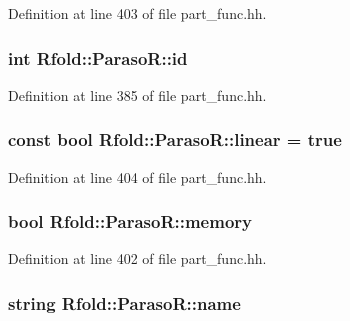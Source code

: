 Definition at line 403 of file part\+\_\+func.\+hh.

\hypertarget{class_rfold_1_1_paraso_r_a707ccdcc12115fbe06a923fb21e58c06}{
\subsubsection[{id}]{\setlength{\rightskip}{0pt plus 5cm}int Rfold\+::\+Paraso\+R\+::id}}\label{class_rfold_1_1_paraso_r_a707ccdcc12115fbe06a923fb21e58c06}


Definition at line 385 of file part\+\_\+func.\+hh.

\hypertarget{class_rfold_1_1_paraso_r_a45220d67941bf0c7f97c1eb586511cb8}{
\subsubsection[{linear}]{\setlength{\rightskip}{0pt plus 5cm}const bool Rfold\+::\+Paraso\+R\+::linear = true\hspace{0.3cm}{\ttfamily [static]}}}\label{class_rfold_1_1_paraso_r_a45220d67941bf0c7f97c1eb586511cb8}


Definition at line 404 of file part\+\_\+func.\+hh.

\hypertarget{class_rfold_1_1_paraso_r_aac983ca08d7d6efbca76b6575ee839e2}{
\subsubsection[{memory}]{\setlength{\rightskip}{0pt plus 5cm}bool Rfold\+::\+Paraso\+R\+::memory}}\label{class_rfold_1_1_paraso_r_aac983ca08d7d6efbca76b6575ee839e2}


Definition at line 402 of file part\+\_\+func.\+hh.

\hypertarget{class_rfold_1_1_paraso_r_a52b17c1475bc8319251b6fbde1a5a6d9}{
\subsubsection[{name}]{\setlength{\rightskip}{0pt plus 5cm}string Rfold\+::\+Paraso\+R\+::name}}\label{class_rfold_1_1_paraso_r_a52b17c1475bc8319251b6fbde1a5a6d9}


